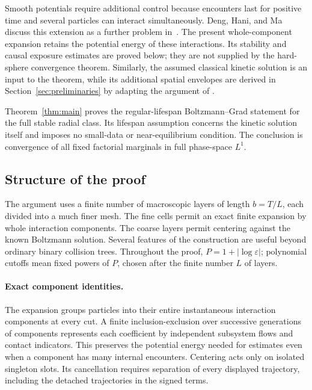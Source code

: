 Smooth potentials require additional control because encounters last
for positive time and several particles can interact simultaneously.
Deng, Hani, and Ma discuss this extension as a further problem
in~\cite[Section~1.4.2]{DHM25}.
The present whole-component expansion retains the potential energy of
these interactions. Its stability and causal exposure estimates are
proved below; they are not supplied by the hard-sphere convergence
theorem. Similarly, the assumed classical kinetic solution is an input
to the theorem, while its additional spatial envelopes are derived in
Section~\ref{sec:preliminaries} by adapting the argument of
\cite[Proposition~A.1]{DHM25}.

Theorem~\ref{thm:main} proves the regular-lifespan Boltzmann--Grad
statement for the full stable radial class. Its lifespan assumption
concerns the kinetic solution itself and imposes no small-data or
near-equilibrium condition. The conclusion is convergence of all fixed
factorial marginals in full phase-space $L^1$.

\subsection{Structure of the proof}

The argument uses a finite number of macroscopic layers of length
$b=T/L$, each divided into a much finer mesh. The fine cells permit an
exact finite expansion by whole interaction components. The coarse
layers permit centering against the known Boltzmann solution. Several
features of the construction are useful beyond ordinary binary
collision trees.
Throughout the proof, $P=1+|\log\varepsilon|$; polynomial cutoffs mean
fixed powers of $P$, chosen after the finite number $L$ of layers.

\paragraph{Exact component identities.}
The expansion groups particles into their entire instantaneous
interaction components at every cut. A finite inclusion-exclusion
over successive generations of components represents each coefficient
by independent subsystem flows and contact indicators. This preserves
the potential energy needed for estimates even when a component has
many internal encounters. Centering acts only on isolated singleton
slots. Its cancellation requires separation of every displayed
trajectory, including the detached trajectories in the signed terms.

